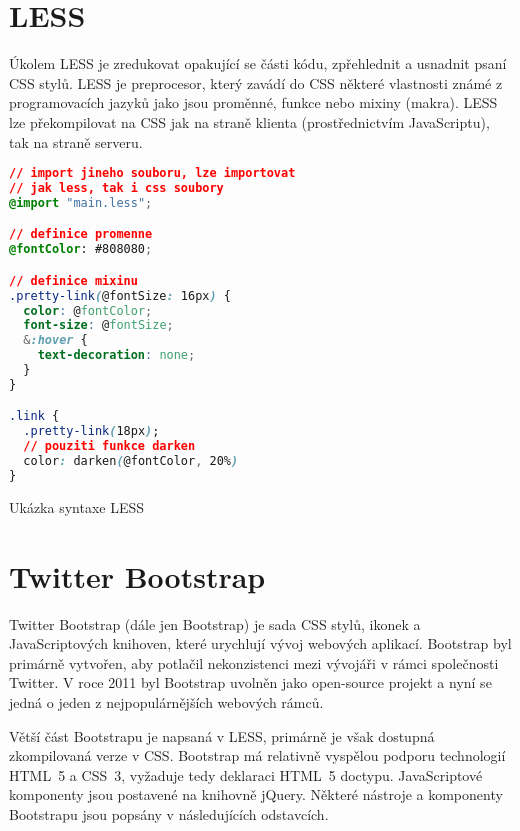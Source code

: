 \section{LESS}
\label{sec:less}

Úkolem LESS je zredukovat opakující se části kódu, zpřehlednit a usnadnit psaní CSS stylů. LESS je preprocesor, který zavádí do CSS některé vlastnosti známé z programovacích jazyků jako jsou proměnné, funkce nebo mixiny (makra). LESS lze překompilovat na CSS jak na straně klienta (prostřednictvím JavaScriptu), tak na straně serveru.

\begin{example}
    \centering
    \begin{lstlisting}[language=css]
// import jineho souboru, lze importovat
// jak less, tak i css soubory
@import "main.less";

// definice promenne
@fontColor: #808080;

// definice mixinu
.pretty-link(@fontSize: 16px) {
  color: @fontColor;
  font-size: @fontSize;
  &:hover {
    text-decoration: none;
  }
}

.link {
  .pretty-link(18px);
  // pouziti funkce darken
  color: darken(@fontColor, 20%)
}
    \end{lstlisting}
    \caption{Ukázka syntaxe LESS}
    \label{example:less-css}
\end{example}

\section{Twitter Bootstrap}
\label{sec:bootstrap}

Twitter Bootstrap (dále jen Bootstrap) je sada CSS stylů, ikonek a JavaScriptových knihoven, které urychlují vývoj webových aplikací. Bootstrap byl primárně vytvořen, aby potlačil nekonzistenci mezi vývojáři v rámci společnosti Twitter. V roce 2011 byl Bootstrap uvolněn jako open-source projekt a nyní se jedná o jeden z nejpopulárnějších webových rámců.

Větší část Bootstrapu je napsaná v LESS, primárně je však dostupná zkompilovaná verze v CSS. Bootstrap má relativně vyspělou podporu technologií HTML~5 a CSS~3, vyžaduje tedy deklaraci HTML~5 doctypu. JavaScriptové komponenty jsou postavené na knihovně jQuery\footnotemark[2]. Některé nástroje a komponenty Bootstrapu jsou popsány v následujících odstavcích.


